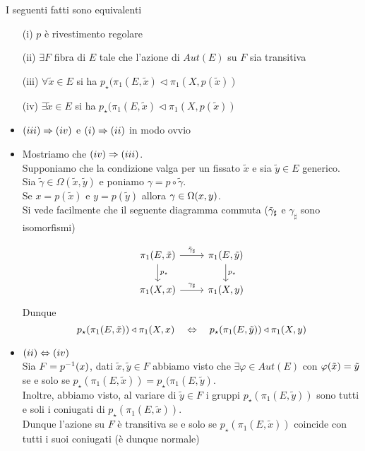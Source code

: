 \begin{thm}I seguenti fatti sono equivalenti 
\begin{itemize}
\item[(i)]$p$ \`e rivestimento regolare
\item[(ii)]$\exists F$ fibra di $E$ tale che l'azione di $Aut(E)$ su $F$ sia transitiva
\item[(iii)]$\forall \tilde{x}\in E$ si ha $p_\star(\pi_1(E,\tilde{x})\triangleleft \pi_1(X, p(\tilde{x}))$
\item[(iv)]$\exists \tilde{x}\in E$ si ha $p_\star(\pi_1(E,\tilde{x})\triangleleft \pi_1(X, p(\tilde{x}))$
\end{itemize}
\proof
\begin{itemize}
\item $(iii)\Rightarrow (iv)$ e $(i) \Rightarrow (ii)$ in modo ovvio
\item Mostriamo che $(iv)\Rightarrow (iii)$.\\
Supponiamo che la condizione valga per un fissato $\tilde{x}$ e sia $\tilde{y}\in E$ generico.\\
Sia $\tilde{\gamma} \in \Omega(\tilde{x},\tilde{y})$ e poniamo $\gamma=p\circ \tilde{\gamma}$.\\
Se $x=p(\tilde{x})$ e $y=p(\tilde{y})$ allora $\gamma\in \Omega(x,y)$.\\
Si vede facilmente che il seguente diagramma commuta ($\tilde{\gamma}_\sharp$ e $\gamma_\sharp$ sono isomorfismi)

$$\begin{tikzcd}
\pi_1(E, \tilde{x}) \arrow{d}{p_\star} \arrow{r}{\tilde{\gamma}_\sharp } &\pi_1(E, \tilde{y}) \arrow{d}{p_\star}\\
\pi_1(X,x) \arrow{r}{\gamma_\sharp} & \pi_1(X,y)
\end{tikzcd}$$
Dunque $$p_\star (\pi_1(E, \tilde{x}))\triangleleft \pi_1(X,x) \quad \Leftrightarrow \quad p_\star (\pi_1(E, \tilde{y}))\triangleleft \pi_1(X,y)$$
\item $(ii) \Leftrightarrow (iv)$ \\
Sia $F=p^{-1} (x)$, dati $\tilde{x}, \tilde{y}\in F$ abbiamo visto che $\exists\varphi\in Aut(E)$ con $\varphi(\tilde{x})=\tilde{y}$ se e solo se $p_\star(\pi_1(E, \tilde{x}))=p_\star(\pi_1(E, \tilde{y})$.\\
Inoltre, abbiamo visto, al variare di $\tilde{y}\in F$ i gruppi $p_\star (\pi_1(E,\tilde{y}))$ sono tutti e soli i coniugati di $p_\star (\pi_1(E,\tilde{x}))$.\\
Dunque l'azione su $F$ \`e transitiva se e solo se $p_\star (\pi_1(E,\tilde{x}))$ coincide con tutti i suoi coniugati (\`e dunque normale)
\end{itemize}
\endproof
\end{thm}
